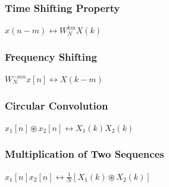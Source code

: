 \documentclass{article}
\begin{document}
\subsubsection{Time Shifting Property}
$x(n-m)\leftrightarrow W_N^{km}X(k)$
\subsubsection{Frequency Shifting}
$W_N^{-mn}x[n]\leftrightarrow X(k-m)$
\subsubsection{Circular Convolution}
$x_1[n]\circledast x_2[n]\leftrightarrow X_1(k)X_2(k)$
\subsubsection{Multiplication of Two Sequences}
$x_1[n]x_2[n]\leftrightarrow \frac{1}{N}[X_1(k)\circledast X_2(k)]$
\end{document}
